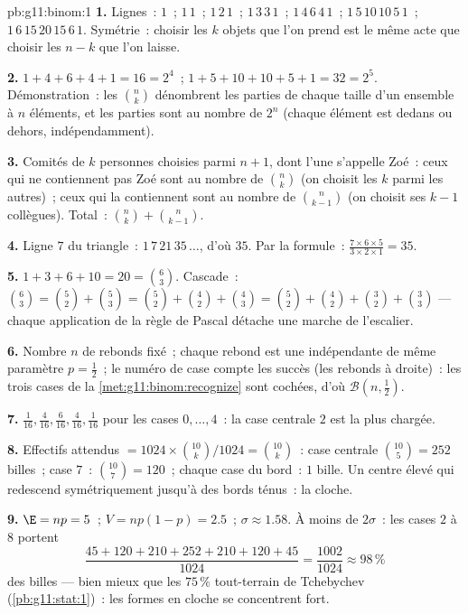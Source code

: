 \begin{solution}{pb:g11:binom:1}
\textbf{1.} Lignes~: $1$~; $1\,1$~; $1\,2\,1$~; $1\,3\,3\,1$~;
$1\,4\,6\,4\,1$~; $1\,5\,10\,10\,5\,1$~;
$1\,6\,15\,20\,15\,6\,1$. Symétrie~: choisir les $k$ objets que
l'on prend est le même acte que choisir les $n - k$ que l'on
laisse.

\textbf{2.} $1 + 4 + 6 + 4 + 1 = 16 = 2^4$~;
$1 + 5 + 10 + 10 + 5 + 1 = 32 = 2^5$. Démonstration~: les
$\binom nk$ dénombrent les parties de chaque taille d'un ensemble à
$n$ éléments, et les parties sont au nombre de $2^n$ (chaque élément
est dedans ou dehors, indépendamment).

\textbf{3.} Comités de $k$ personnes choisies parmi $n + 1$, dont
l'une s'appelle Zoé~: ceux qui ne contiennent pas Zoé sont au nombre
de $\binom nk$ (on choisit les $k$ parmi les autres)~; ceux qui la
contiennent sont au nombre de $\binom{n}{k-1}$ (on choisit ses
$k - 1$ collègues). Total~: $\binom nk + \binom{n}{k-1}$.

\textbf{4.} Ligne $7$ du triangle~: $1\,7\,21\,35\,\dots$, d'où
$35$. Par la formule~: $\frac{7 \times 6 \times 5}{3 \times 2
\times 1} = 35$.

\textbf{5.} $1 + 3 + 6 + 10 = 20 = \binom63$. Cascade~:
$\binom63 = \binom52 + \binom53 = \binom52 + \binom42 +
\binom43 = \binom52 + \binom42 + \binom32 + \binom33$ --- chaque
application de la règle de Pascal détache une marche de l'escalier.

\textbf{6.} Nombre $n$ de rebonds fixé~; chaque rebond est une
 indépendante de même paramètre
$p = \frac12$~; le numéro de case compte les succès (les rebonds à
droite)~: les trois cases de la
\cref{met:g11:binom:recognize} sont cochées, d'où
$\mathcal B\!\left(n, \frac12\right)$.

\textbf{7.}  $\frac{1}{16}, \frac{4}{16},
\frac{6}{16}, \frac{4}{16}, \frac{1}{16}$ pour les cases
$0, \dots, 4$~: la case centrale $2$ est la plus chargée.

\textbf{8.} Effectifs attendus $= 1024 \times
\binom{10}{k}/1024 = \binom{10}{k}$~: case centrale
$\binom{10}{5} = 252$ billes~; case $7$~: $\binom{10}{7} = 120$~;
chaque case du bord~: $1$ bille. Un centre élevé qui redescend
symétriquement jusqu'à des bords ténus~: la cloche.

\textbf{9.} $\E = np = 5$~; $V = np(1 - p) = 2.5$~;
$\sigma \approx 1.58$. À moins de $2\sigma$~: les cases $2$ à $8$
portent
\[
\frac{45 + 120 + 210 + 252 + 210 + 120 + 45}{1024}
= \frac{1002}{1024} \approx 98\,\%
\]
des billes --- bien mieux que les $75\,\%$ tout-terrain de
Tchebychev (\cref{pb:g11:stat:1})~: les formes en cloche se
concentrent fort.


\end{solution}

